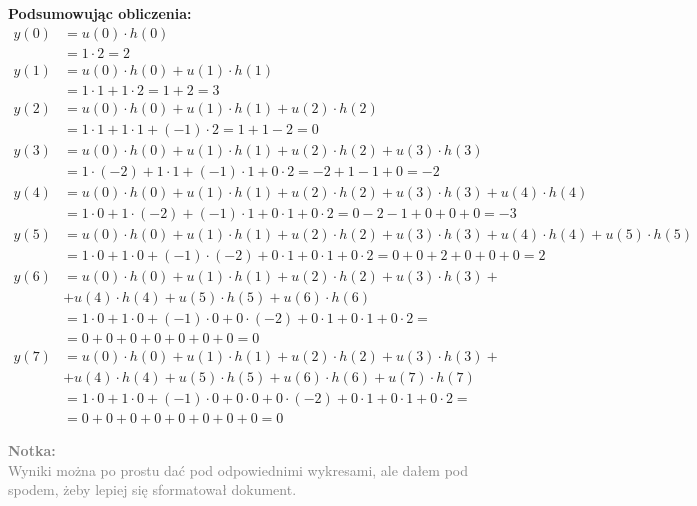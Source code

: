 \documentclass[12pt]{scrartcl}
\newcommand{\notka}[1]{
	\textcolor{gray}{\textbf{Notka:\\\indent} #1}
}
\begin{document}
\textbf{Podsumowując obliczenia:}
\begin{align*}
y(0) &= u(0) \cdot h(0) \\	
	&= 1 \cdot 2=2 \\
y(1) &= u(0) \cdot h(0) + u(1) \cdot h(1) \\	
	&= 1 \cdot 1 + 1 \cdot 2=1 + 2 = 3\\
y(2) &= u(0) \cdot h(0) + u(1) \cdot h(1) + u(2) \cdot h(2) \\	
	&= 1\cdot1 
	+ 1\cdot1 
	+ (-1)\cdot2 
	= 1 +1 -2 = 0 \\
y(3) &= u(0) \cdot h(0) + u(1) \cdot h(1) + u(2) \cdot h(2) + u(3) \cdot h(3) \\	
	&= 1\cdot(-2)
	+ 1\cdot1
	+ (-1)\cdot1
	+ 0\cdot2
	= -2 +1 -1 +0 = -2 \\
y(4) &= u(0) \cdot h(0) + u(1) \cdot h(1) + u(2) \cdot h(2) + u(3) \cdot h(3) + u(4) \cdot h(4)\\
	&=
	  1		\cdot 0
	+ 1		\cdot (-2)
	+ (-1)	\cdot 1
	+ 0		\cdot 1
	+ 0		\cdot 2
	= 0 -2 -1 +0 +0 +0 = -3\\
y(5) &= u(0) \cdot h(0) + u(1) \cdot h(1) + u(2) \cdot h(2) + u(3) \cdot h(3) + u(4) \cdot h(4) + u(5) \cdot h(5)\\
	&=
	1		\cdot 0
	+ 1		\cdot 0
	+ (-1)	\cdot (-2)
	+ 0		\cdot 1
	+ 0		\cdot 1
	+ 0		\cdot 2
	= 0 +0 +2 +0 +0 +0 = 2\\
y(6) &= u(0) \cdot h(0) + u(1) \cdot h(1) + u(2) \cdot h(2) + u(3) \cdot h(3) +
	\\ &+ u(4) \cdot h(4) + u(5) \cdot h(5) + u(6) \cdot h(6)\\
	&=
	1		\cdot 0
	+ 1		\cdot 0
	+ (-1)	\cdot 0
	+ 0		\cdot (-2)
	+ 0		\cdot 1
	+ 0		\cdot 1
	+ 0		\cdot 2 = \\
	&= 0 +0 +0 +0 +0 +0 +0 = 0\\
y(7) &= u(0) \cdot h(0) + u(1) \cdot h(1) + u(2) \cdot h(2) + u(3) \cdot h(3) +
	\\ &+ u(4) \cdot h(4) + u(5) \cdot h(5) + u(6) \cdot h(6) + u(7) \cdot h(7)\\
	&=
	1		\cdot 0
	+ 1		\cdot 0
	+ (-1)	\cdot 0
	+ 0		\cdot 0
	+ 0		\cdot (-2)
	+ 0		\cdot 1
	+ 0		\cdot 1
	+ 0		\cdot 2 = \\
	&= 0 +0 +0 +0 +0 +0 +0 +0 = 0
\end{align*}
\notka{Wyniki można po prostu dać pod odpowiednimi wykresami, ale dałem pod spodem, żeby lepiej się sformatował dokument.}\\
\end{document}
